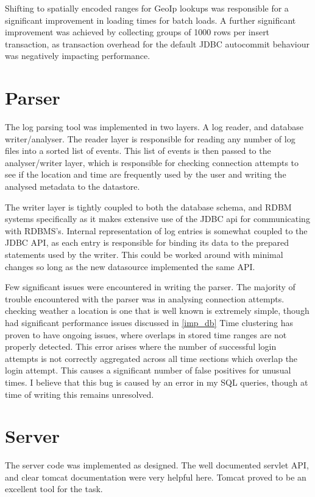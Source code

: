 Shifting to spatially encoded ranges for GeoIp lookups was responsible for a significant improvement in loading times for batch loads. A further significant improvement was achieved by collecting groups of 1000 rows per insert transaction, as transaction overhead for the default JDBC autocommit behaviour was negatively impacting performance. 
 
\section{Parser}

The log parsing tool was implemented in two layers. A log reader, and database writer/analyser. 
The reader layer is responsible for reading any number of log files into a sorted list of events.
This list of events is then passed to the analyser/writer layer, which is responsible for checking connection attempts to see if the location and time are frequently used by the user and writing the analysed metadata to the datastore.

The writer layer is tightly coupled to both the database schema, and RDBM systems specifically as it makes extensive use of the JDBC api for communicating with RDBMS's.
Internal representation of log entries is somewhat coupled to the JDBC API, as each entry is responsible for binding its data to the prepared statements used by the writer.
This could be worked around with minimal changes so long as the new datasource implemented the same API.

Few significant issues were encountered in writing the parser. 
The majority of trouble encountered with the parser was in analysing connection attempts. checking weather a location  is one that is well known is extremely simple, though had significant performance issues discussed in \ref{imp_db}
Time clustering has proven to have ongoing issues, where overlaps in stored time ranges are not properly detected. This error arises where the number of successful login attempts is not correctly aggregated across all time sections which overlap the login attempt. This causes a significant number of false positives for unusual times. I believe that this bug is caused by an error in my SQL queries, though at time of writing this remains unresolved. 

\section{Server}

The server code was implemented as designed. The well documented servlet API, and clear tomcat documentation were very helpful here. Tomcat proved to be an excellent tool for the task.

